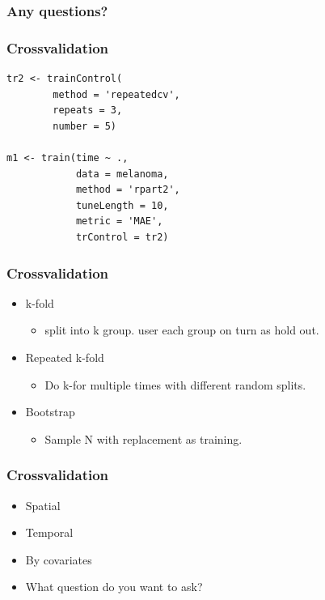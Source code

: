 \documentclass[handout, aspectratio = 169]{beamer}
\begin{document}
\begin{frame}
\frametitle{Any questions?}


\end{frame} 


\begin{frame}[fragile]
\frametitle{Crossvalidation}
\begin{Verbatim}
tr2 <- trainControl(
        method = 'repeatedcv',
        repeats = 3,
        number = 5)

m1 <- train(time ~ ., 
            data = melanoma,
            method = 'rpart2',
            tuneLength = 10,
            metric = 'MAE',
            trControl = tr2)

\end{Verbatim}

\end{frame} 




\begin{frame}
\frametitle{Crossvalidation}

\begin{itemize}
\item k-fold
\begin{itemize}
\item split into k group. user each group on turn as hold out.
\end{itemize}
\item Repeated k-fold
\begin{itemize}
\item Do k-for multiple times with different random splits.
\end{itemize}
\item Bootstrap
\begin{itemize}
\item Sample N with replacement as training.
\end{itemize}
\end{itemize}
\end{frame} 

\begin{frame}
\frametitle{Crossvalidation}

\begin{itemize}
\item Spatial
\item Temporal
\item By covariates
\item What question do you want to ask?
\end{itemize}
\end{frame} 
\end{document}
